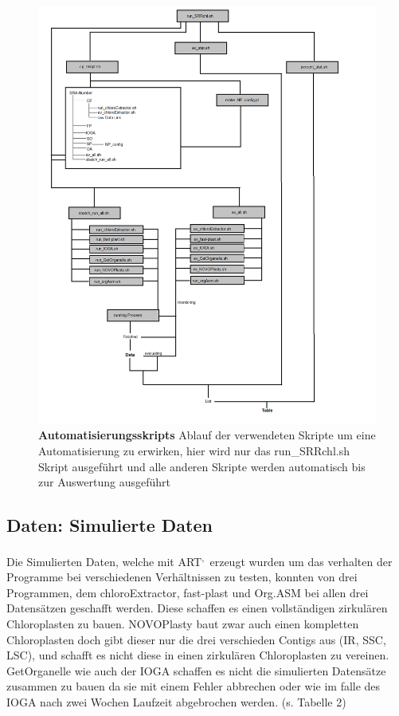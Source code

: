 \documentclass{scrartcl}
\begin{document}
\begin{figure}
\includegraphics[width=.9\linewidth]{./Diagram_Master.png}
\caption[Automatisierungsskripts]{\textbf{Automatisierungsskripts} Ablauf der verwendeten Skripte um eine Automatisierung zu erwirken, hier wird nur das run\_SRRchl.sh Skript ausgeführt und alle anderen Skripte werden automatisch bis zur Auswertung ausgeführt}
\end{figure}


\subsection{Daten: Simulierte Daten}
\label{sec-4-2}
Die Simulierten Daten, welche mit ART\footnotemark[44]{}\textsuperscript{,}\,\footnotemark[45]{} erzeugt wurden um das verhalten der Programme bei verschiedenen Verhältnissen zu testen, konnten von drei Programmen, dem chloroExtractor, fast-plast und Org.ASM 
bei allen drei Datensätzen geschafft werden. Diese schaffen es einen vollständigen zirkulären Chloroplasten zu bauen. NOVOPlasty baut zwar auch einen kompletten Chloroplasten doch gibt dieser 
nur die drei verschieden Contigs aus (IR, SSC, LSC), und schafft es nicht diese in einen zirkulären Chloroplasten zu vereinen. GetOrganelle wie auch der IOGA schaffen es nicht die
simulierten Datensätze zusammen zu bauen da sie mit einem Fehler abbrechen oder wie im falle des IOGA nach zwei Wochen Laufzeit abgebrochen werden. (s. Tabelle 2) 
\end{document}

